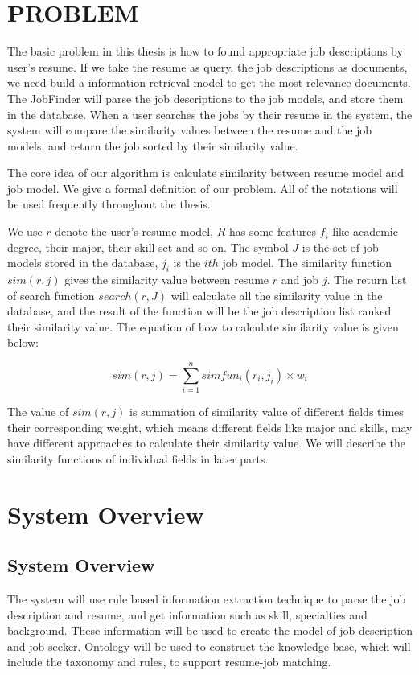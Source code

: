 \chapter{PROBLEM}

The basic problem in this thesis is how to found appropriate job descriptions by user's resume. If we take the resume as query, the job descriptions as documents, we need build a information retrieval model to get the most relevance documents.  The JobFinder will parse the job descriptions to the job models, and store them in the database. When a user searches the jobs by their resume in the system, the system will compare the similarity values between the resume and the job models, and return the job sorted by their similarity value.

The core idea of our algorithm is calculate similarity between resume model and job model.
We give a formal definition of our problem. All of the notations will be used frequently throughout the thesis.

We use $r$ denote the user's resume model, $R$ has some features $f_i$ like academic degree, their major, their skill set and so on. The symbol $J$ is the set of job models stored in the database, $j_i$ is the $ith$ job model. The similarity function $sim(r, j)$ gives the similarity value between resume $r$ and job $j$. The return list of search function $search(r,J)$ will calculate all the similarity value in the database, and the result of the function will be the job description list ranked their similarity value. The equation of how to calculate similarity value is given below:

$$ sim(r, j) = \sum_{i=1}^{n} simfun_i(r_i,j_i) \times w_i $$

The value of $sim(r, j)$ is summation of similarity value of different fields times their corresponding weight, which means different fields like major and skills,  may have different approaches to calculate their similarity value. We will describe the similarity functions of individual fields in later parts.



\chapter{System Overview}

\section{System Overview}
The system will use rule based information extraction technique to parse the job description and resume, and get information such as skill, specialties and background. These information will be used to create the model of job description and job seeker.  Ontology will be used to construct the knowledge base, which will include the taxonomy and rules, to support resume-job matching.

